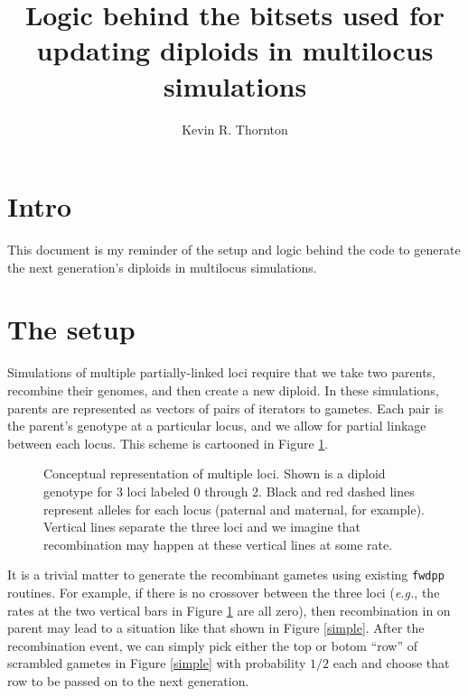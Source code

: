 \documentclass{article}
\title{Logic behind the bitsets used for updating diploids in multilocus simulations}
\author[1]{Kevin R. Thornton}
\affil[1]{Department of Ecology and Evolutionary Biology, UC Irvine}
\date{}
\begin{document}
\maketitle
\section*{Intro}
This document is my reminder of the setup and logic behind the code to generate the next generation's diploids in multilocus simulations.
\section*{The setup}

Simulations of multiple partially-linked loci require that we take two parents, recombine their genomes, and then create a new diploid.  In these simulations, parents are represented as vectors of pairs of iterators to gametes.  Each pair is the parent's genotype at a particular locus, and we allow for partial linkage between each locus.  This scheme is cartooned in Figure \ref{concept}.

\begin{figure}[!h]
  \centering
  \caption{\label{concept}Conceptual representation of multiple loci.  Shown is a diploid genotype for 3 loci labeled 0 through 2.  Black and red dashed lines represent alleles for each locus (paternal and maternal, for example).  Vertical lines separate the three loci and we imagine that recombination may happen at these vertical lines at some rate.}
  \end{figure}

It is a trivial matter to generate the recombinant gametes using existing \texttt{fwdpp} routines.  For example, if there is no crossover between the three loci (\textit{e.g.}, the rates at the two vertical bars in Figure \ref{concept} are all zero), then recombination in on parent may lead to a situation like that shown in Figure \ref{simple}.  After the recombination event, we can simply pick either the top or botom ``row'' of scrambled gametes in Figure \ref{simple} with probability $1/2$ each and choose that row to be passed on to the next generation.
  
\end{document}

